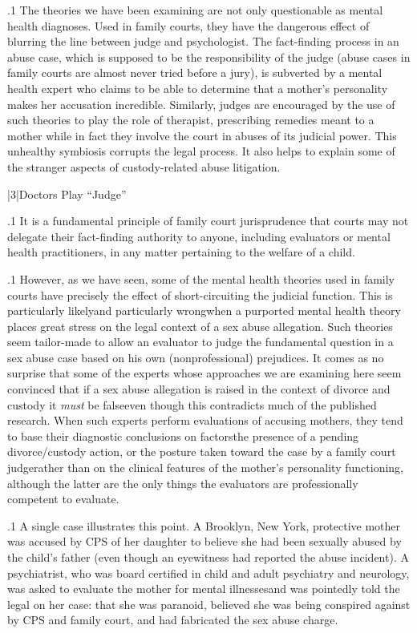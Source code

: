\documentclass[11pt, twoside]{article}
\begin{document}
{\p.1{%
\noindent{}The theories we have been examining are not only questionable as
mental health diagnoses. Used in family courts, they have the dangerous effect of blurring the line between judge and psychologist. The
fact-finding process in an abuse case, which is supposed to be the responsibility of the judge (abuse cases in family courts are almost never
tried before a jury), is subverted by a mental health expert who claims
to be able to determine that a mother’s personality makes her accusation incredible. Similarly, judges are encouraged by the use of such
theories to play the role of therapist, prescribing remedies meant to
 a mother while in fact they involve the court in abuses of its judicial power. This unhealthy symbiosis corrupts the legal process. It also
helps to explain some of the stranger aspects of custody-related abuse
litigation.
}%


\s|3|{Doctors Play ``Judge''}

\p.1{%
\noindent{}It is a fundamental principle of family court jurisprudence that courts
may not delegate their fact-finding authority to anyone, including
evaluators or mental health practitioners, in any matter pertaining to
the welfare of a child.
}%

\p.1{%
However, as we have seen, some of the mental health theories used
in family courts have precisely the effect of short-circuiting the judicial function. This is particularly likely\mdash{}and particularly wrong\mdash{}when
a purported mental health theory places great stress on the legal context
of a sex abuse allegation. Such theories seem tailor-made to allow an
evaluator to judge the fundamental question in a sex abuse case based
on his own (nonprofessional) prejudices. It comes as no surprise that
some of the experts whose approaches we are examining here seem convinced that if a sex abuse allegation is raised in the context of divorce
and custody it \textit{must} be false\mdash{}even though this contradicts much of the
published research. When such experts perform evaluations of accusing mothers, they tend to base their diagnostic conclusions on 
factors\mdash{}the presence of a pending divorce/custody action, or the posture taken toward the case by a family court judge\mdash{}rather than on the
clinical features of the mother’s personality functioning, although the
latter are the only things the evaluators are professionally competent to
evaluate.
}%

\p.1{%
A single case illustrates this point. A Brooklyn, New York, protective
mother was accused by CPS of  her daughter to believe
she had been sexually abused by the child’s father (even though an eyewitness had reported the abuse incident). A psychiatrist, who was board
certified in child and adult psychiatry and neurology, was asked to evaluate the mother for mental illnesses\mdash{}and was pointedly told the legal
 on her case: that she was paranoid, believed she was being conspired against by CPS and family court, and had fabricated the sex abuse
charge.
}%

}
\end{document}
